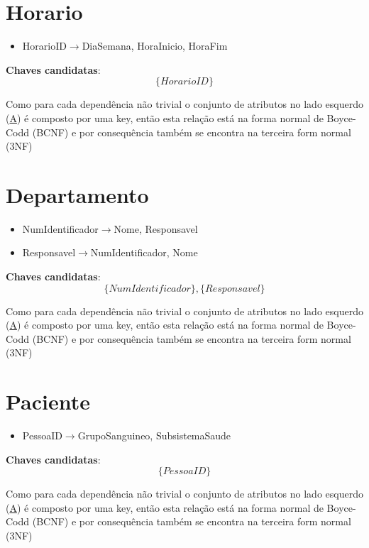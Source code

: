 \documentclass[article, a4paper, 12pt, oneside]{memoir}
\begin{document}
\newpage

\section*{Horario}
\begin{itemize}
	\item HorarioID$\rightarrow$DiaSemana, HoraInicio, HoraFim
\end{itemize}

\textbf{Chaves candidatas}:\\
\[
\{ HorarioID \}
\]

Como para cada dependência não trivial o conjunto de atributos no lado esquerdo (\underline{A}) é composto por uma key, então esta relação está na forma normal de Boyce-Codd (BCNF) e por consequência também se encontra na terceira form normal (3NF)

\section*{Departamento}
\begin{itemize}
	\item NumIdentificador$\rightarrow$Nome, Responsavel
	\item Responsavel$\rightarrow$NumIdentificador, Nome
\end{itemize}

\textbf{Chaves candidatas}:\\
\[
\{ NumIdentificador \}, \{ Responsavel \}
\]

Como para cada dependência não trivial o conjunto de atributos no lado esquerdo (\underline{A}) é composto por uma key, então esta relação está na forma normal de Boyce-Codd (BCNF) e por consequência também se encontra na terceira form normal (3NF)

\section*{Paciente}
\begin{itemize}
	\item PessoaID$\rightarrow$GrupoSanguineo, SubsistemaSaude
\end{itemize}

\textbf{Chaves candidatas}:\\
\[
\{ PessoaID \}
\]

Como para cada dependência não trivial o conjunto de atributos no lado esquerdo (\underline{A}) é composto por uma key, então esta relação está na forma normal de Boyce-Codd (BCNF) e por consequência também se encontra na terceira form normal (3NF)
\end{document}
